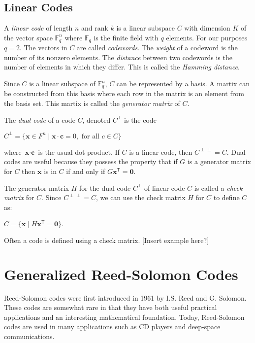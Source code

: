 \documentclass{article}
\begin{document}
\subsection{Linear Codes}
A \textit{linear code} of length $n$ and rank $k$ is a linear subspace $C$ with dimension $K$ of the vector space $\mathbb{F}^{n}_{q}$ where $\mathbb{F}_{q}$ is the finite field with $q$ elements. For our purposes $q = 2$. The vectors in $C$ are called \textit{codewords}. The \textit{weight} of a codeword is the number of its nonzero elements. The \textit{distance} between two codewords is the number of elements in which they differ. This is called the \textit{Hamming distance}.

Since $C$ is a linear subspace of $\mathbb{F}^{n}_{q}$, $C$ can be represented by a basis. A martix can be constructed from this basis where each row in the matrix is an element from the basis set. This martix is called the \textit{generator matrix} of $C$.

The \textit{dual code} of a code $C$, denoted $C^{\perp}$ is the code
\begin{center}
$C^{\perp} = \{\textbf{x} \in F^{n} \mid \textbf{x} \cdot \textbf{c} = 0, \text{ for all } c \in C\}$
\end{center}
where $\textbf{x} \cdot \textbf{c}$ is the usual dot product. If $C$ is a linear code, then $C^{\perp \perp} = C$. Dual codes are useful because they possess the property that if $G$ is a generator matrix for $C$ then $\textbf{x}$ is in $C$ if and only if $G\textbf{x}^{\mathsf{T}} = \textbf{0}$.

The generator matrix $H$ for the dual code $C^{\perp}$ of linear code $C$ is called a \textit{check matrix} for $C$. Since $C^{\perp \perp} = C$, we can use the check matrix $H$ for $C$ to define $C$ as:
\begin{center}
$C = \{\textbf{x} \mid H\textbf{x}^{\mathsf{T}} = \textbf{0}\}$.
\end{center}
Often a code is defined using a check matrix. [Insert example here?]

\section{Generalized Reed-Solomon Codes}
Reed-Solomon codes were first introduced in 1961 by I.S. Reed and G. Solomon. These codes are somewhat rare in that they have both useful practical applications and an interesting mathematical foundation. Today, Reed-Solomon codes are used in many applications such as CD players and deep-space communications.
\end{document}
